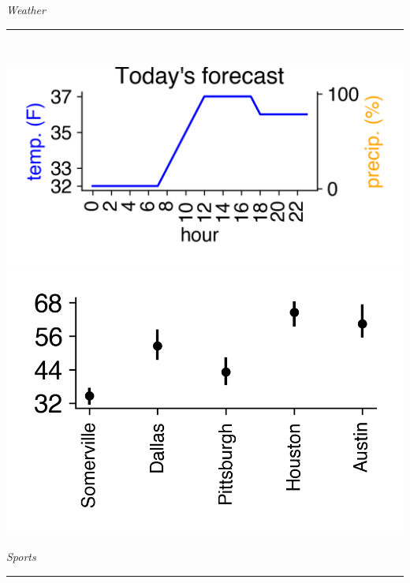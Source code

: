 \documentclass[landscape]{article}
\date{\today}
\renewcommand\headline[1]{\begin{center} {\huge \textsl{ #1}}\\ %
			\rule[5pt]{0.8\hsize}{0.5pt}\\ \end{center}}
\begin{document}
\maketitle

\begin{multicols}{3}

\headline{Weather}
\center\includegraphics[width=\linewidth]{images/weather-forecast.png}
\noindent\center\includegraphics[width=0.75\linewidth]{images/weather-ranges.png}

\columnbreak
\headline{Sports}

\begin{center}
	
\end{center}
\begin{center}
	
\end{center}


\end{multicols}
\end{document}
